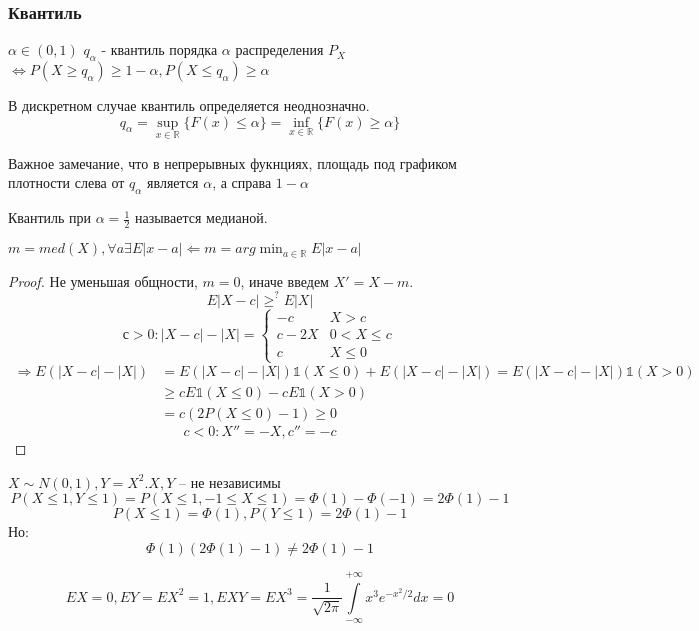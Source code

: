 \documentclass{article}
\begin{document}
    \subsubsection{Квантиль}
    \begin{definition}
        
        $\alpha \in (0, 1)$
        $q_\alpha$ - квантиль порядка $\alpha$ распределения $P_X$ $\Leftrightarrow P(X\ge q_\alpha) \ge 1-\alpha, P(X \le q_\alpha) \ge \alpha$
    \end{definition}
    \begin{remark}
        В дискретном случае квантиль определяется неоднозначно.
         $$ q_\alpha =\sup_{x\in \mathbb{R}} \{F(x) \le \alpha\} = \inf_{x\in \mathbb{R}} \{F(x) \ge \alpha\}$$
    \end{remark}
    \begin{remark}
        Важное замечание, что в непрерывных фукнциях, площадь под графиком плотности слева от $q_\alpha$ является $\alpha$, а справа $1 - \alpha$
    \end{remark}
    \begin{definition}
        Квантиль при $\alpha = \frac{1}{2}$ называется медианой.
    \end{definition}
    \begin{theorem}
        $ m = med(X), \forall a \exists E|x-a| \Leftarrow m = arg\min_{a \in \mathbb{R}} E|x-a| $
        \begin{proof}
            Не уменьшая общности, $m = 0$, иначе введем $X' = X - m$.
            $$E|X-c| \ge^? E|X|$$
            $$ с>0:  |X-c| - |X| = \begin{cases}
                -c & X> c\\
                c - 2X  & 0 < X \le c \\
                c & X\le 0
            \end{cases}
            $$
            \begin{align*}
             \Rightarrow E(|X-c| -|X|) &= E(|X-c| - |X|) \mathbb{1} (X\le 0)  + E(|X-c| -|X|) = E(|X-c| - |X|) \mathbb{1}(X>0)\\ 
             &\ge cE \mathbb{1} (X\le0) - c E \mathbb{1}(X>0) \\
             &= c(2 P(X\le 0) - 1) \ge 0
            \end{align*}
            $$ c < 0: X'' = -X, c'' = -c$$
        \end{proof}
    \end{theorem}
    \begin{example}
        $X \sim N(0, 1), Y = X^2. X, Y$ -- не независимы
        $$ P(X \le 1, Y \le 1) = P(X \le 1, -1 \le X \le 1) = \Phi(1) - \Phi (-1) = 2 \Phi(1) - 1$$
        $$ P(X \le 1) = \Phi(1), P(Y \le 1) = 2 \Phi (1) - 1$$
        Но:
        $$ \Phi(1) (2\Phi(1) - 1) \ne 2 \Phi(1) - 1$$
        
        $$ EX = 0, EY = EX^2 = 1, EXY= EX^3 = \frac{1}{\sqrt{2\pi}} \int\limits_{-\infty}^{+\infty} x^3 e^{-x^2/2} dx = 0$$
    \end{example}
\end{document}

